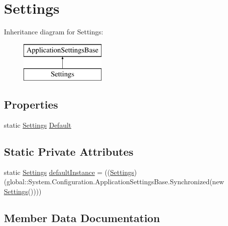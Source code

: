 \hypertarget{classWildlifeTrackingApp_1_1Properties_1_1Settings}{}\section{Settings}
\label{classWildlifeTrackingApp_1_1Properties_1_1Settings}
Inheritance diagram for Settings\+:\begin{figure}[H]
\begin{center}
\leavevmode
\includegraphics[height=2.000000cm]{classWildlifeTrackingApp_1_1Properties_1_1Settings}
\end{center}
\end{figure}
\subsection*{Properties}
\begin{DoxyCompactItemize}
\item 
static \hyperlink{classWildlifeTrackingApp_1_1Properties_1_1Settings}{Settings} \hyperlink{classWildlifeTrackingApp_1_1Properties_1_1Settings_af44ce680f893da1cfe4575b306835697}{Default}
\end{DoxyCompactItemize}
\subsection*{Static Private Attributes}
\begin{DoxyCompactItemize}
\item 
static \hyperlink{classWildlifeTrackingApp_1_1Properties_1_1Settings}{Settings} \hyperlink{classWildlifeTrackingApp_1_1Properties_1_1Settings_a8a09a0578d98ad02e7537e8b01debf7e}{default\+Instance} = ((\hyperlink{classWildlifeTrackingApp_1_1Properties_1_1Settings}{Settings})(global\+::\+System.\+Configuration.\+Application\+Settings\+Base.\+Synchronized(new \hyperlink{classWildlifeTrackingApp_1_1Properties_1_1Settings}{Settings}())))
\end{DoxyCompactItemize}


\subsection{Member Data Documentation}
\mbox{\label{classWildlifeTrackingApp_1_1Properties_1_1Settings_a8a09a0578d98ad02e7537e8b01debf7e}} 
